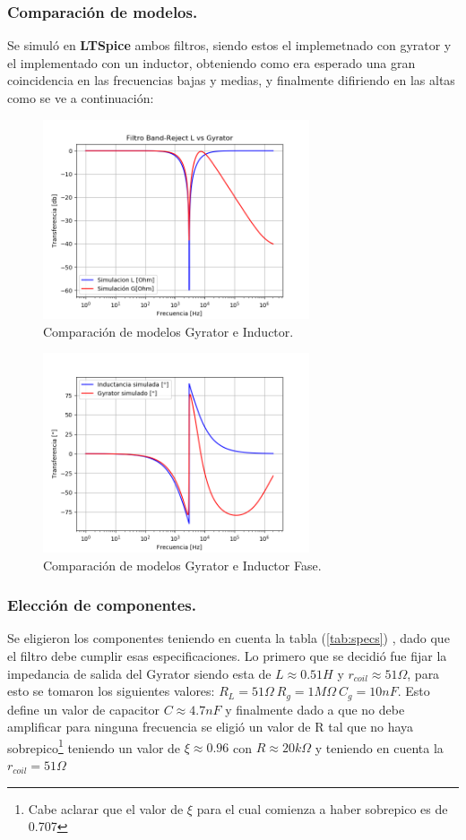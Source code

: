 \documentclass[a4paper]{article}
\begin{document}
\subsubsection{Comparación de modelos.}
Se simuló en \textbf{LTSpice} ambos filtros, siendo estos el implemetnado con gyrator y el implementado con un inductor, obteniendo como era esperado una gran coincidencia en las frecuencias bajas y medias, y finalmente difiriendo en las altas como se ve a continuación:
\begin{figure}[H]	
	\centering
	\includegraphics[width=0.7\textwidth]{ImagenesEj2/simBR.PNG}
	\caption{Comparación de modelos Gyrator e Inductor.}
	\label{fig:gyrIndBR}
\end{figure}
\begin{figure}[H]	
	\centering
	\includegraphics[width=0.7\textwidth]{ImagenesEj2/simBRP.PNG}
	\caption{Comparación de modelos Gyrator e Inductor Fase.}
	\label{fig:gyrIndPBR}
\end{figure}
\subsubsection{Elección de componentes.}
Se eligieron los componentes teniendo en cuenta la tabla (\ref{tab:specs}) , dado que el filtro debe cumplir esas especificaciones.
Lo primero que se decidió fue fijar la impedancia de salida del Gyrator siendo esta de $L \approx 0.51H $ y $r_{coil} \approx 51\Omega $, para esto se tomaron los siguientes valores: $R_L = 51\Omega \ R_g = 1M\Omega \ C_g = 10nF$.
 Esto define un valor de capacitor $C \approx 4.7nF$ y finalmente dado a que no debe amplificar para ninguna frecuencia se eligió un valor de R tal que no haya sobrepico\footnote{Cabe aclarar que el valor de $\xi$ para el cual comienza a haber sobrepico es de 0.707} teniendo un valor de $\xi \approx 0.96 $ con $R \approx 20k\Omega $ y teniendo en cuenta la $r_{coil} = 51\Omega$  
\end{document}
